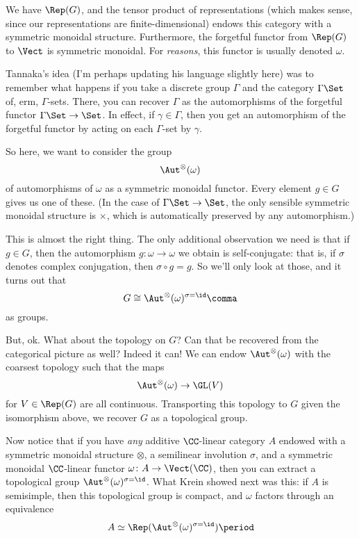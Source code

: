 \documentclass[leqno]{article}
\begin{document}
We have \(\Rep(G)\), and the tensor product of representations
(which makes sense, since our representations are finite-dimensional)
endows this category with a symmetric monoidal structure.
Furthermore, the forgetful functor from \(\Rep(G)\) to \(\Vect\)
is symmetric monoidal.
For \emph{reasons}, this functor is usually denoted \(\omega\).

Tannaka's idea (I'm perhaps updating his language slightly here)
was to remember what happens if you take a discrete group \(\Gamma\)
and the category \(\Gamma\Set\) of, erm, \(\Gamma\)-sets.
There, you can recover \(\Gamma\) as the automorphisms
of the forgetful functor \(\Gamma\Set \to \Set\).
In effect, if \(\gamma \in \Gamma\), then
you get an automorphism of the forgetful functor
by acting on each \(\Gamma\)-set by \(\gamma\).

So here, we want to consider the group
\begin{equation*}
    \Aut^{\otimes}(\omega)
\end{equation*}
of automorphisms of \(\omega\) as a symmetric monoidal functor.
Every element \(g \in G\) gives us one of these.
(In the case of \(\Gamma\Set \to \Set\),
the only sensible symmetric monoidal structure is \(\times\),
which is automatically preserved by any automorphism.)

This is almost the right thing.
The only additional observation we need is that
if \(g \in G\), then the automorphism \(g \colon \omega \to \omega\)
we obtain is self-conjugate:
that is, if \(\sigma\) denotes complex conjugation, then
\(\sigma \circ g = g\).
So we'll only look at those, and it turns out that
\begin{equation*}
    G \cong \Aut^{\otimes}(\omega)^{\sigma=\id} \comma
\end{equation*}
as groups.

But, ok. What about the topology on \(G\)?
Can that be recovered from the categorical picture as well?
Indeed it can!
We can endow \(\Aut^{\otimes}(\omega)\) with
the coarsest topology such that the maps
\begin{equation*}
    \Aut^{\otimes }(\omega) \to \GL(V)
\end{equation*}
for \(V \in \Rep(G)\) are all continuous.
Transporting this topology to \(G\) given the isomorphism above,
we recover \(G\) as a topological group.

Now notice that
if you have \emph{any} additive \(\CC\)-linear category \(A\)
endowed with a symmetric monoidal structure \(\otimes\),
a semilinear involution \(\sigma\),
and a symmetric monoidal
\(\CC\)-linear functor \(\omega \colon A \to \Vect(\CC)\),
then you can extract a topological group
\(\Aut^{\otimes}(\omega)^{\sigma=\id}\).
What Krein showed next was this:
if \(A\) is semisimple, then this topological group is compact,
and \(\omega\) factors through an equivalence
\begin{equation*}
    A \simeq \Rep(\Aut^{\otimes}(\omega)^{\sigma=\id}) \period
\end{equation*}
\end{document}
